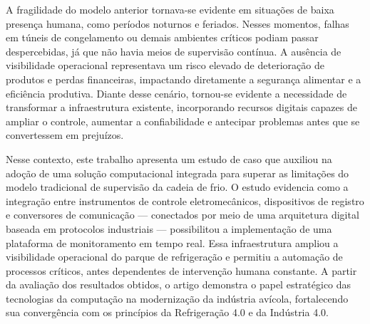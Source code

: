 \documentclass[12pt]{article}
\begin{document}
A fragilidade do modelo anterior tornava-se evidente em situações de baixa presença humana, como períodos noturnos e feriados. Nesses momentos, falhas em túneis de congelamento ou demais ambientes críticos podiam passar despercebidas, já que não havia meios de supervisão contínua. A ausência de visibilidade operacional representava um risco elevado de deterioração de produtos e perdas financeiras, impactando diretamente a segurança alimentar e a eficiência produtiva. Diante desse cenário, tornou-se evidente a necessidade de transformar a infraestrutura existente, incorporando recursos digitais capazes de ampliar o controle, aumentar a confiabilidade e antecipar problemas antes que se convertessem em prejuízos.


Nesse contexto, este trabalho apresenta um estudo de caso que auxiliou na adoção de uma solução computacional integrada para superar as limitações do modelo tradicional de supervisão da cadeia de frio. O estudo evidencia como a integração entre instrumentos de controle eletromecânicos, dispositivos de registro e conversores de comunicação — conectados por meio de uma arquitetura digital baseada em protocolos industriais — possibilitou a implementação de uma plataforma de monitoramento em tempo real. Essa infraestrutura ampliou a visibilidade operacional do parque de refrigeração e permitiu a automação de processos críticos, antes dependentes de intervenção humana constante. A partir da avaliação dos resultados obtidos, o artigo demonstra o papel estratégico das tecnologias da computação na modernização da indústria avícola, fortalecendo sua convergência com os princípios da Refrigeração 4.0 e da Indústria 4.0.

\end{document}
